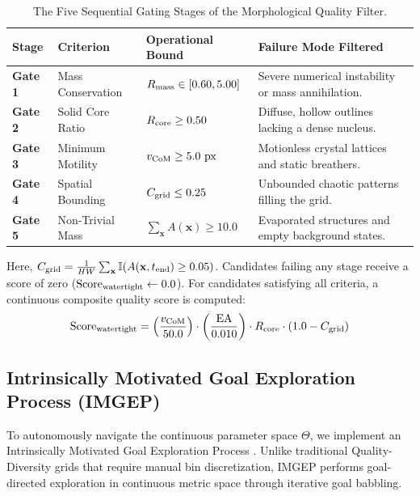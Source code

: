 \begin{table}[htbp]
\centering
\footnotesize
\caption{The Five Sequential Gating Stages of the Morphological Quality Filter.}
\label{tab:watertight_gates}
\begin{tabularx}{\textwidth}{lp{3.2cm}p{3.2cm}X}
\toprule
\textbf{Stage} & \textbf{Criterion} & \textbf{Operational Bound} & \textbf{Failure Mode Filtered} \\
\midrule
\textbf{Gate 1} & Mass Conservation & $R_{\text{mass}} \in [0.60, 5.00]$ & Severe numerical instability or mass annihilation. \\
\textbf{Gate 2} & Solid Core Ratio & $R_{\text{core}} \ge 0.50$ & Diffuse, hollow outlines lacking a dense nucleus. \\
\textbf{Gate 3} & Minimum Motility & $v_{\text{CoM}} \ge 5.0\text{ px}$ & Motionless crystal lattices and static breathers. \\
\textbf{Gate 4} & Spatial Bounding & $C_{\text{grid}} \le 0.25$ & Unbounded chaotic patterns filling the grid. \\
\textbf{Gate 5} & Non-Trivial Mass & $\sum_{\mathbf{x}} A(\mathbf{x}) \ge 10.0$ & Evaporated structures and empty background states. \\
\bottomrule
\end{tabularx}
\end{table}

Here, $C_{\text{grid}} = \frac{1}{HW} \sum_{\mathbf{x}} \mathbb{I}(A(\mathbf{x}, t_{\text{end}}) \ge 0.05)$. Candidates failing any stage receive a score of zero ($\text{Score}_{\text{watertight}} \leftarrow 0.0$). For candidates satisfying all criteria, a continuous composite quality score is computed:
\begin{equation}
\text{Score}_{\text{watertight}} = \left( \frac{v_{\text{CoM}}}{50.0} \right) \cdot \left( \frac{\text{EA}}{0.010} \right) \cdot R_{\text{core}} \cdot \left( 1.0 - C_{\text{grid}} \right)
\label{eq:watertight_score}
\end{equation}

\subsection{Intrinsically Motivated Goal Exploration Process (IMGEP)}
\label{subsec:discovery_imgep_algorithm}

To autonomously navigate the continuous parameter space $\Theta$, we implement an Intrinsically Motivated Goal Exploration Process \parencite{oudeyer2007intrinsic, michel2025exploring}. Unlike traditional Quality-Diversity grids that require manual bin discretization, IMGEP performs goal-directed exploration in continuous metric space through iterative goal babbling.

